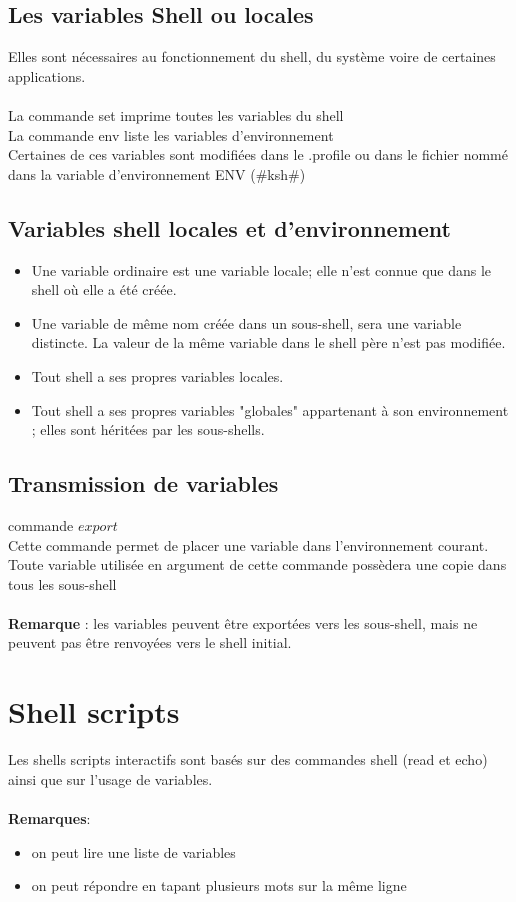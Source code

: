 			\subsection{Les variables Shell ou locales}			
				Elles sont nécessaires au fonctionnement du shell, du système voire de certaines applications.\\ \\

				La commande set imprime toutes les variables du shell\\
				La commande env liste les variables d'environnement\\
				Certaines de ces variables sont modifiées dans le .profile ou dans le fichier nommé dans la variable d'environnement ENV (#ksh#)
			\subsection{ Variables shell locales et d'environnement}
				\begin{itemize}
					\item Une variable ordinaire est une variable locale; elle n'est connue que dans le shell où elle a été créée.
					\item Une variable de même nom créée dans un sous-shell, sera une variable distincte. La valeur de la même variable dans le shell père n'est pas modifiée.
					\item Tout shell a ses propres variables locales.
					\item Tout shell a ses propres variables "globales" appartenant à son environnement ; elles sont héritées par les sous-shells.
				\end{itemize}

			\subsection{Transmission de variables}						
				commande $export$\\
				Cette commande permet de placer une variable dans l'environnement courant. Toute variable utilisée en argument de cette commande possèdera une copie dans tous les sous-shell\\ \\

				\textbf{Remarque} : 
				les variables peuvent être exportées vers les sous-shell, mais ne peuvent pas être renvoyées vers le shell initial.
		\section{Shell scripts}
			Les shells scripts interactifs sont basés sur des commandes shell (read et echo) ainsi que sur l'usage de variables. \\ \\
			\textbf{Remarques}: 
			\begin{itemize}
				\item on peut lire une liste de variables 
				\item on peut répondre en tapant plusieurs mots sur la même ligne
			\end{itemize}
